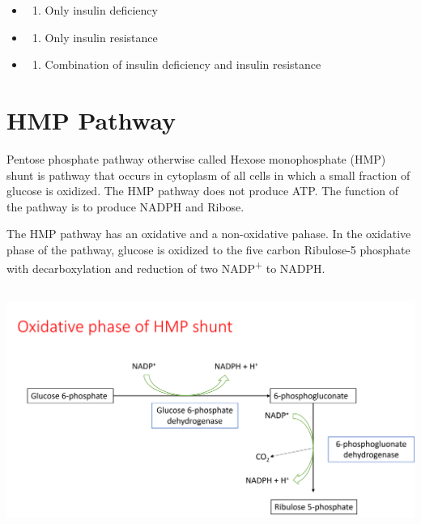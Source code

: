 \documentclass[
]{book}
\providecommand{\tightlist}{%
  \setlength{\itemsep}{0pt}\setlength{\parskip}{0pt}}
\begin{document}
\begin{itemize}
\tightlist
\item
  \begin{enumerate}
  \def\labelenumi{(\Alph{enumi})}
  \tightlist
  \item
    Only insulin deficiency\\
  \end{enumerate}
\item
  \begin{enumerate}
  \def\labelenumi{(\Alph{enumi})}
  \setcounter{enumi}{1}
  \tightlist
  \item
    Only insulin resistance\\
  \end{enumerate}
\item
  \begin{enumerate}
  \def\labelenumi{(\Alph{enumi})}
  \setcounter{enumi}{2}
  \tightlist
  \item
    Combination of insulin deficiency and insulin resistance
  \end{enumerate}
\end{itemize}

\chapter{HMP Pathway}\label{hmp-pathway}

Pentose phosphate pathway otherwise called Hexose monophosphate (HMP) shunt is pathway that occurs in cytoplasm of all cells in which a small fraction of glucose is oxidized. The HMP pathway does not produce ATP. The function of the pathway is to produce NADPH and Ribose.

The HMP pathway has an oxidative and a non-oxidative pahase. In the oxidative phase of the pathway, glucose is oxidized to the five carbon Ribulose-5 phosphate with decarboxylation and reduction of two NADP\textsuperscript{+} to NADPH.

\includegraphics[width=\textwidth,height=3.125in]{Images/hmp1.png}
\end{document}
